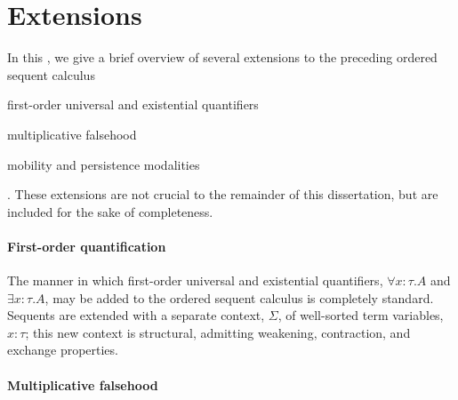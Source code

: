 \section{Extensions}\label{sec:ordered-logic:extensions}

In this , we give a brief overview of several extensions to the preceding ordered sequent calculus
\begin{itemize*}[label=, before=\unskip{:}, itemjoin={,}, itemjoin*={, and}]
\item first-order universal and existential quantifiers
\item multiplicative falsehood
\item mobility and persistence modalities
\end{itemize*}.
These extensions are not crucial to the remainder of this dissertation, but are included for the sake of completeness.

\paragraph*{First-order quantification}

The manner in which first-order universal and existential quantifiers, $\forall x{:}\tau.A$ and $\exists x{:}\tau.A$, may be added to the ordered sequent calculus is completely standard.
Sequents are extended with a separate context, $\Sigma$, of well-sorted term variables, $x{:}\tau$; this new context is structural, admitting weakening, contraction, and exchange properties.


\paragraph*{Multiplicative falsehood}

